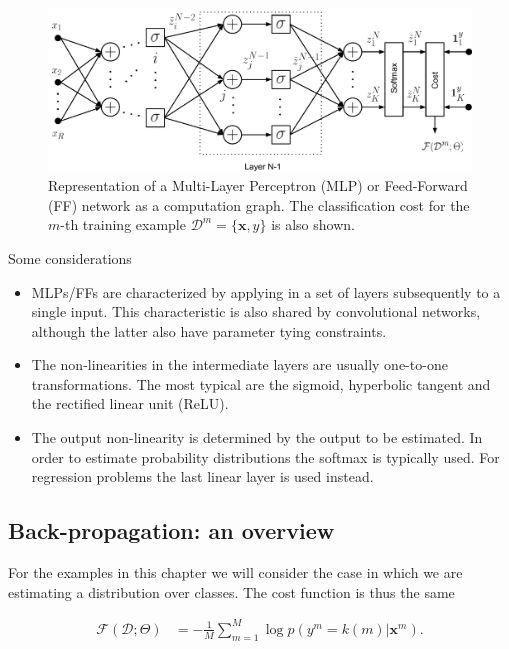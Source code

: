 \begin{figure}[!hb]
\centering
\includegraphics[scale=0.6]{figs/deep_learning/NN.pdf}
\caption{Representation of a Multi-Layer Perceptron (MLP) or Feed-Forward (FF) network as a computation graph. The classification cost
for the $m$-th training example $\mathcal{D}^m=\{\mathbf{x}, y\}$ is also
shown.}
\label{fig:FF}
\end{figure}

\noindent Some considerations

\begin{itemize}
\item MLPs/FFs are characterized by applying in a set of layers subsequently to a single input. This characteristic is also shared by convolutional networks, although the latter also have parameter tying constraints.
\item The non-linearities in the intermediate layers are usually one-to-one transformations. The most typical are the sigmoid, hyperbolic tangent and the rectified linear unit (ReLU). 
\item The output non-linearity is determined by the output to be estimated. In order to estimate probability distributions the softmax is typically used. For regression problems the last linear layer is used instead.
\end{itemize}

\subsection{Back-propagation: an overview}

For the examples in this chapter we will consider the case in which we are estimating a distribution over classes. The cost function is thus the same

\begin{align}
\mathcal{F}(\mathcal{D};\Theta) & = -\frac{1}{M}\sum_{m=1}^{M} \log p(y^m=k(m) | \mathbf{x}^m).
\end{align}

